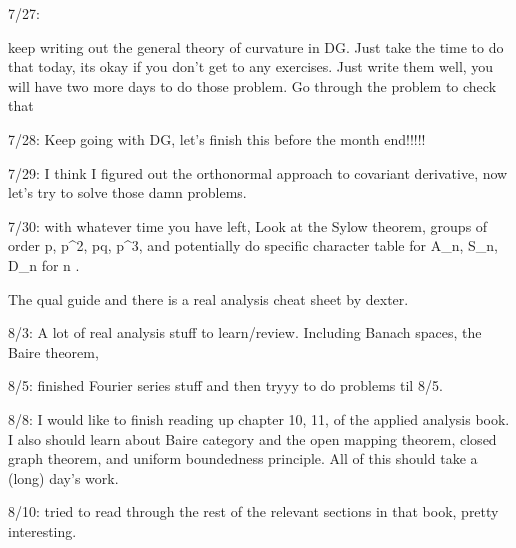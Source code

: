 7/27:

keep writing out the general theory of curvature in DG. Just take the time to do that today, its okay if you don't get to any exercises. Just write them well, you will have two more days to do those problem. Go through the problem to check that 


7/28: Keep going with DG, let's finish this before the month end!!!!!

7/29: I think I figured out the orthonormal approach to covariant derivative, now let's try to solve those damn problems.



7/30: with whatever time you have left, Look at the Sylow theorem, groups of order p, p^2, pq, p^3, and potentially do specific character table for A_n, S_n, D_n for n . 



The qual guide and there is a real analysis cheat sheet by dexter. 

8/3: A lot of real analysis stuff to learn/review. Including Banach spaces, the Baire theorem, 



8/5: finished Fourier series stuff and then tryyy to do problems til 8/5.


8/8: I would like to finish reading up chapter 10, 11, of the applied analysis book. I also should learn about Baire category and the open mapping theorem, closed graph theorem, and uniform boundedness principle. All of this should take a (long) day's work.


8/10: tried to read through the rest of the relevant sections in that book, pretty interesting.